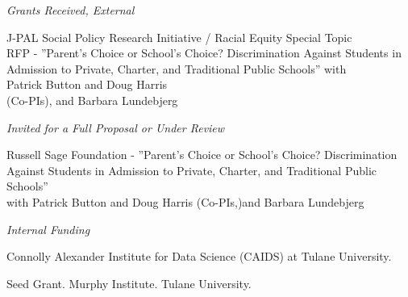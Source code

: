 \documentclass[letterpaper]{article}
\renewenvironment{itemize}{
  \begin{list}{}{
    \setlength{\leftmargin}{1.5em}
  }
}{
  \end{list}
}
\begin{document}
\vspace{2 mm}
\textit{Grants Received, External} \\
\begin{itemize}
  \item {} {}J-PAL Social Policy Research Initiative / Racial Equity Special Topic \\{\makebox[17mm]{\hfill}} RFP - ”Parent’s Choice or School’s Choice? Discrimination Against Students in \\{\makebox[17mm]{\hfill}} Admission to Private, Charter, and Traditional Public Schools” with \\{\makebox[17mm]{\hfill}} Patrick Button and Doug Harris \\{\makebox[17mm]{\hfill}} (Co-PIs), and Barbara Lundebjerg\student
\end{itemize}

\textit{Invited for a Full Proposal or Under Review} \\
\begin{itemize}
  \item {} {}Russell Sage Foundation - ”Parent’s Choice or School’s Choice? Discrimination \\{\makebox[17mm]{\hfill}} Against Students in Admission to Private, Charter, and Traditional Public Schools” \\{\makebox[17mm]{\hfill}}  with Patrick Button and Doug Harris (Co-PIs,)and Barbara Lundebjerg\student
\end{itemize}

\vspace{2 mm}
\textit{Internal Funding} \\
\begin{itemize}
  \item {} {}Connolly Alexander Institute for Data Science (CAIDS) at Tulane University.
\end{itemize}
\vspace{2 mm}
\begin{itemize}
  \item {} {}Seed Grant. Murphy Institute. Tulane University.
\end{itemize}
\end{document}
